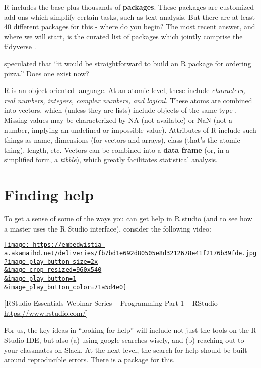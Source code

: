 \documentclass[]{book}
\theoremstyle{definition}
\theoremstyle{definition}
\theoremstyle{definition}
\theoremstyle{remark}
\begin{document}
R includes the base plus thousands of \textbf{packages}. These packages
are customized add-ons which simplify certain tasks, such as text
analysis. But there are at least \href{}{40 different packages for this}
- where do you begin? The most recent answer, and where we will start,
is the curated list of packages which jointly comprise the tidyverse
\citep{wickham2016r}.

\citet{peng2015r} speculated that ``it would be straightforward to build
an R package for ordering pizza.'' Does one exist now?

R is an object-oriented language. At an atomic level, these include
\emph{characters, real numbers, integers, complex numbers, and logical.}
These atoms are combined into vectors, which (unless they are lists)
include objects of the same type \citep{peng2015r}. Missing values may
be characterized by NA (not available) or NaN (not a number, implying an
undefined or impossible value). Attributes of R include such things as
name, dimensions (for vectors and arrays), class (that's the atomic
thing), length, etc. Vectors can be combined into a \textbf{data frame}
(or, in a simplified form, a \emph{tibble}), which greatly facilitates
statistical analysis.

\chapter{Finding help}\label{finding-help}

To get a sense of some of the ways you can get help in R studio (and to
see how a master uses the R Studio interface), consider the following
video:

\href{https://www.rstudio.com/resources/webinars/rstudio-essentials-webinar-series-part-1/?wvideo=k8kz4e0p2v}{\texttt{[image: https://embedwistia-a.akamaihd.net/deliveries/fb7bd1e692d80505e8d3212678e41f2176b39fde.jpg?image\_play\_button\_size=2x\\\&image\_crop\_resized=960x540\\\&image\_play\_button=1\\\&image\_play\_button\_color=71a5d4e0]}}

{[}RStudio Essentials Webinar Series -- Programming Part 1 -- RStudio
\href{https://www.rstudio.com/resources/webinars/rstudio-essentials-webinar-series-part-1/?wvideo=k8kz4e0p2v}{https://www.rstudio.com/{]}}

For us, the key ideas in ``looking for help'' will include not just the
tools on the R Studio IDE, but also (a) using google searches wisely,
and (b) reaching out to your classmates on Slack. At the next level, the
search for help should be built around reproducible errors. There is a
\href{https://cran.r-project.org/web/packages/reprex/index.html}{package}
for this.
\end{document}
